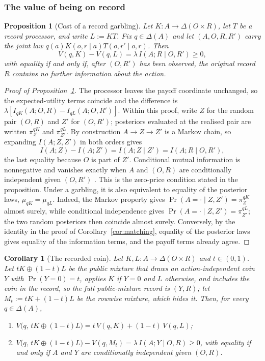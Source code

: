 \documentclass[11pt,a4paper]{article}
\newtheorem{proposition}[theorem]{Proposition}
\newtheorem{corollary}[theorem]{Corollary}
\theoremstyle{definition}
\newcommand{\D}{\Delta}
\newcommand{\I}{I}
\newcommand{\1}{\mathbf 1}
\begin{document}
\subsubsection{The value of being on record}
\label{app:record-value-proofs}

\begin{proposition}[Cost of a record garbling]\label{prop:garbling-price}
Let $K:A\to\D(O\times R)$, let $T$ be a record processor, and write
$L:=KT$.  Fix $q\in\D(A)$ and let $(A,O,R,R')$ carry the joint law $q(a)K(o,r\mid a)T(o,r'\mid o,r)$.  Then
\[
 V(q,K)-V(q,L)=\lambda\,\I\!\left(A;R\mid O,R'\right)\ge0,
\]
with equality if and only if, after $(O,R')$ has been observed, the original record $R$ contains no further
information about the action.
\end{proposition}

\begin{proof}[Proof of Proposition~\ref{prop:garbling-price}]
The processor leaves the payoff coordinate unchanged, so the expected-utility terms coincide and the difference is
$\lambda[\I_{qK}(A;O,R)-\I_{qL}(A;O,R')]$.  Within this proof, write $Z$ for the random pair $(O,R)$ and $Z'$ for
$(O,R')$; posteriors evaluated at the realised pair are written
$\pi^{qK}_{Z}$ and $\pi^{qL}_{Z'}$.  By construction $A\to Z\to Z'$ is
a Markov chain, so expanding $\I(A;Z,Z')$ in both orders gives
\[
 \I(A;Z)-\I(A;Z')=\I(A;Z\mid Z')=\I(A;R\mid O,R'),
\]
the last equality because $O$ is part of $Z'$.  Conditional mutual information is nonnegative and vanishes exactly
when $A$ and $(O,R)$ are conditionally independent given $(O,R')$ \cite{CoverThomas2006}.  This is the zero-price
condition stated in the proposition.  Under a garbling, it is also equivalent to equality of the posterior laws,
$\mu_{qK}=\mu_{qL}$.  Indeed, the Markov property gives
$\Pr(A=\cdot\mid Z,Z')=\pi^{qK}_{Z}$ almost surely, while conditional independence gives
$\Pr(A=\cdot\mid Z,Z')=\pi^{qL}_{Z'}$; the two random posteriors then coincide almost surely.  Conversely, by the
identity in the proof of Corollary~\ref{cor:matching}, equality of the posterior laws gives equality of the
information terms, and the payoff terms already agree.
\end{proof}

\begin{corollary}[The recorded coin]\label{cor:recorded-coin}
Let $K,L:A\to\D(O\times R)$ and $t\in(0,1)$.  Let $tK\oplus(1-t)L$ be the public mixture that draws an
action-independent coin $Y$ with $\Pr(Y=0)=t$, applies $K$ if $Y=0$ and $L$ otherwise, and includes the coin in
the record, so the full public-mixture record is $(Y,R)$; let $M_t:=tK+(1-t)L$ be the rowwise mixture, which hides it.  Then, for every $q\in\D(A)$,
\begin{enumerate}[label=\textup{(\roman*)},leftmargin=*]
\item $V\bigl(q,\,tK\oplus(1-t)L\bigr)=t\,V(q,K)+(1-t)\,V(q,L)$;
\item $V\bigl(q,\,tK\oplus(1-t)L\bigr)-V(q,M_t)=\lambda\,\I(A;Y\mid O,R)\ge0$, with equality if and only if $A$
and $Y$ are conditionally independent given $(O,R)$.
\end{enumerate}
\end{corollary}
\end{document}
